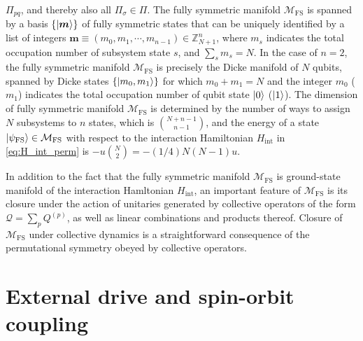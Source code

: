 \documentclass[nofootinbib,notitlepage,11pt]{revtex4-2}
\renewcommand{\t}{\text} %
\newcommand{\p}[1]{\left(#1\right)} %
\renewcommand{\set}[1]{\left\{#1\right\}} %
\renewcommand{\v}{\bm} %
\newcommand{\1}{\mathds{1}}
\newcommand{\M}{\mathcal{M}}
\newcommand{\Q}{\mathcal{Q}}
\newcommand{\ZZ}{\mathbb{Z}}
\newcommand{\FS}{\text{FS}}
\begin{document}
$\Pi_{pq}$, and thereby also all $\Pi_\sigma\in\Pi$.  The fully
symmetric manifold $\M_\FS$ is spanned by a basis $\set{\ket{\v m}}$
of fully symmetric states that can be uniquely identified by a list of
integers $\v m\equiv\p{m_0,m_1,\cdots,m_{n-1}}\in\ZZ_{N+1}^n$, where
$m_s$ indicates the total occupation number of subsystem state $s$,
and $\sum_sm_s=N$.  In the case of $n=2$, the fully symmetric manifold
$\M_\FS$ is precisely the Dicke manifold\cite{dicke1954coherence} of
$N$ qubits, spanned by Dicke states $\set{\ket{m_0,m_1}}$ for which
$m_0+m_1=N$ and the integer $m_0$ ($m_1$) indicates the total
occupation number of qubit state $\ket{0}$ ($\ket{1}$).  The dimension
of fully symmetric manifold $\M_\FS$ is determined by the number of
ways to assign $N$ subsystems to $n$ states, which is
${N+n-1 \choose n-1}$, and the energy of a state
$\ket{\psi_\FS}\in\M_\FS$ with respect to the interaction Hamiltonian
$H_{\t{int}}$ in \eqref{eq:H_int_perm} is
$-u{N \choose 2}=-\p{1/4}N\p{N-1}u$.

In addition to the fact that the fully symmetric manifold $\M_\FS$ is
ground-state manifold of the interaction Hamltonian $H_{\t{int}}$, an
important feature of $\M_\FS$ is its closure under the action of
unitaries generated by collective operators of the form
$\Q=\sum_pQ^{(p)}$, as well as linear combinations and products
thereof.  Closure of $\M_\FS$ under collective dynamics is a
straightforward consequence of the permutational symmetry obeyed by
collective operators.

\section{External drive and spin-orbit coupling}
\label{sec:drive_SOC}
\end{document}
